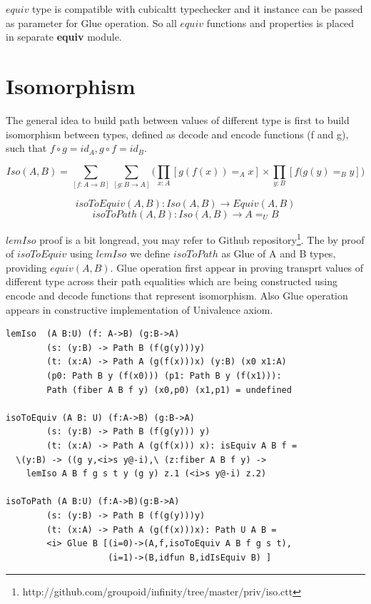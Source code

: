 \documentclass{svproc}
\begin{document}
$equiv$ type is compatible with cubicaltt typechecker and it instance
can be passed as parameter for Glue operation. So all $equiv$ functions and properties
is placed in separate {\bf equiv} module.

\section{Isomorphism}

The general idea to build path between values of different type is first
to build isomorphism between types, defined as decode and encode functions (f and g),
such that $f \circ g = id_A, g \circ f = id_B$.

$$Iso(A,B) = \sum_{[f:A\rightarrow B]}\sum_{[g:B\rightarrow A]}\Biggl( \prod_{x:A} [ g(f(x)) =_A x ] \times \prod_{y:B} [ f(g(y) =_B y ] \Biggr)$$

$$isoToEquiv(A,B) : Iso(A,B) \rightarrow Equiv(A,B)$$
$$isoToPath(A,B) : Iso(A,B) \rightarrow A =_U B$$

$lemIso$ proof is a bit longread, you may refer to Github
repository\footnote{http://github.com/groupoid/infinity/tree/master/priv/iso.ctt}.
The by proof of $isoToEquiv$ using $lemIso$ we define $isoToPath$ as
Glue of A and B types, providing $equiv(A,B)$. Glue operation first appear in
proving transprt values of different type across their path equalities which are being constructed
using encode and decode functions that represent isomorphism. Also Glue operation
appears in constructive implementation of Univalence axiom\cite{Mortberg17}.

\begin{lstlisting}[mathescape=true]
lemIso  (A B:U) (f: A->B) (g:B->A)
        (s: (y:B) -> Path B (f(g(y)))y)
        (t: (x:A) -> Path A (g(f(x)))x) (y:B) (x0 x1:A)
        (p0: Path B y (f(x0))) (p1: Path B y (f(x1))):
        Path (fiber A B f y) (x0,p0) (x1,p1) = undefined

isoToEquiv (A B: U) (f:A->B) (g:B->A)
        (s: (y:B) -> Path B (f(g(y))) y)
        (t: (x:A) -> Path A (g(f(x))) x): isEquiv A B f =
  \(y:B) -> ((g y,<i>s y@-i),\ (z:fiber A B f y) ->
    lemIso A B f g s t y (g y) z.1 (<i>s y@-i) z.2)

isoToPath (A B:U) (f:A->B)(g:B->A)
        (s: (y:B) -> Path B (f(g(y)))y)
        (t: (x:A) -> Path A (g(f(x)))x): Path U A B =
        <i> Glue B [(i=0)->(A,f,isoToEquiv A B f g s t),
                    (i=1)->(B,idfun B,idIsEquiv B) ]
\end{lstlisting}
\end{document}
